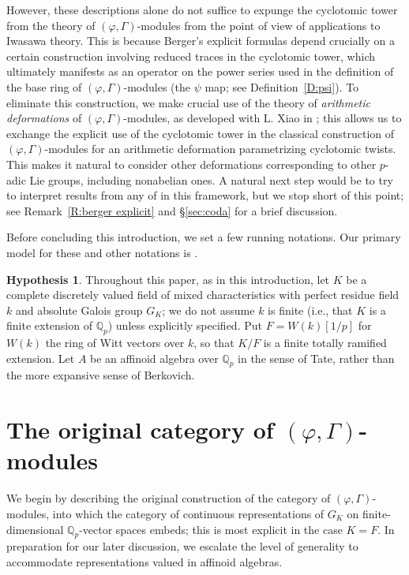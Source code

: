 \documentclass[12pt]{amsart}
\theoremstyle{definition}
\newtheorem{hypothesis}[theorem]{Hypothesis}
\numberwithin{equation}{theorem}
\newcommand{\QQ}{\mathbb{Q}}
\begin{document}
However, these descriptions alone do not suffice to expunge the cyclotomic tower from
the theory of $(\varphi, \Gamma)$-modules from the point of view of applications to Iwasawa theory. This is because Berger's explicit formulas depend crucially on a certain construction
involving reduced traces in the cyclotomic tower, which ultimately manifests as an operator on the power series used in the definition of the base ring of $(\varphi, \Gamma)$-modules (the $\psi$ map; see Definition~\ref{D:psi}). To eliminate this construction, we make crucial use of 
the theory of \emph{arithmetic deformations} of $(\varphi, \Gamma)$-modules, as developed with L. Xiao in \cite{kpx}; this allows us to exchange the explicit use of the cyclotomic tower in the classical construction of $(\varphi, \Gamma)$-modules for an arithmetic deformation parametrizing cyclotomic twists.
This makes it natural to consider other deformations corresponding to other $p$-adic Lie groups, including nonabelian ones. A natural next step would be to try to interpret results from any of \cite{berger-fourquaux, berger-schneider-xie, schneider-venjakob} in this framework, but we stop short of this point; 
see Remark~\ref{R:berger explicit} and \S\ref{sec:coda} for a brief discussion.



Before concluding this introduction, we set a few running notations. Our primary model for these and other notations is \cite{kpx}.
\setcounter{theorem}{0}
\begin{hypothesis}
Throughout this paper, as in this introduction, let $K$ be a complete discretely valued field of mixed characteristics with perfect residue field $k$ and absolute Galois group $G_K$; we do not assume $k$ is finite (i.e., that $K$ is a finite extension of $\QQ_p$) unless explicitly specified.
Put $F = W(k)[1/p]$ for $W(k)$ the ring of Witt vectors over $k$, so that $K/F$ is a finite totally ramified extension.
Let $A$ be an affinoid algebra over $\QQ_p$ in the sense of Tate, rather than the more expansive sense of Berkovich. 
\end{hypothesis}

\section{The original category of $(\varphi, \Gamma)$-modules}
\label{sec:categories}

We begin by describing the original construction of the category of $(\varphi, \Gamma)$-modules,
into which the category of continuous representations of $G_K$ on finite-dimensional $\QQ_p$-vector spaces embeds; this is most explicit in the case $K=F$.
In preparation for our later discussion, we escalate the level of generality to accommodate representations valued in affinoid algebras.
\end{document}
